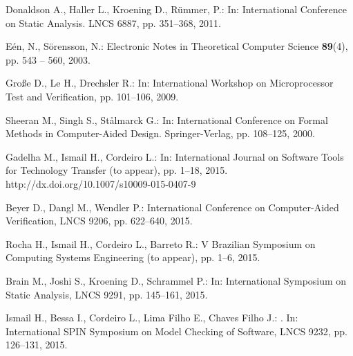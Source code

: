 \documentclass{acm_sen_article}
\begin{document}
\begin{thebibliography}{1}
Donaldson A., Haller L., Kroening D., R{\"{u}}mmer, P.:
\newblock In: International Conference on Static Analysis. LNCS 6887, pp. 351--368, 2011.

E{\'{e}}n, N., S{\"{o}}rensson, N.:
\newblock Electronic Notes in Theoretical Computer Science \textbf{89}(4), pp. 543 -- 560, 2003.

Gro{\ss}e D., Le H., Drechsler R.:
\newblock In: International Workshop on Microprocessor Test and Verification, pp. 101--106, 2009.

Sheeran M., Singh S., St{\aa}lmarck G.:
\newblock In: International Conference on Formal Methods in Computer-Aided Design. Springer-Verlag, pp. 108--125, 2000.

Gadelha M., Ismail H., Cordeiro L.:
\newblock In: International Journal on Software Tools for Technology Transfer (to appear), pp. 1--18, 2015.
\newblock http://dx.doi.org/10.1007/s10009-015-0407-9

Beyer D., Dangl M., Wendler P.:
\newblock International Conference on Computer-Aided Verification, LNCS 9206, pp. 622--640, 2015.

Rocha H., Ismail H., Cordeiro L., Barreto R.:
\newblock V Brazilian Symposium on Computing Systems Engineering (to appear), pp. 1--6, 2015.

Brain M., Joshi S., Kroening D., Schrammel P.:
\newblock In: International Symposium on Static Analysis, LNCS 9291, pp. 145--161, 2015.

Ismail H., Bessa I., Cordeiro L., Lima Filho E., Chaves Filho J.:
. 
\newblock In: International SPIN Symposium on Model Checking of Software, LNCS 9232, pp. 126--131, 2015.


\end{thebibliography}
\end{document}
